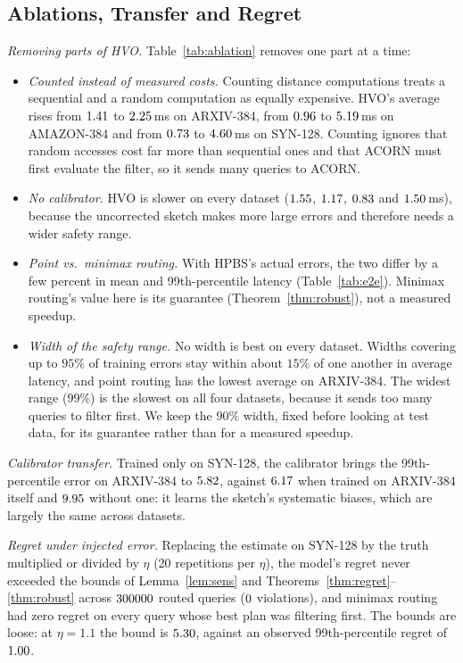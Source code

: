 \documentclass[sigconf, nonacm]{acmart}
\begin{document}
\subsection{Ablations, Transfer and Regret}\label{sec:eval_hw}

\emph{Removing parts of HVO.} Table~\ref{tab:ablation} removes one part at a time:
\begin{itemize}
    \item \emph{Counted instead of measured costs.} Counting distance computations treats a sequential and a random computation as equally expensive. HVO's average rises from $1.41$ to $2.25$\,ms on ARXIV-384, from $0.96$ to $5.19$\,ms on AMAZON-384 and from $0.73$ to $4.60$\,ms on SYN-128. Counting ignores that random accesses cost far more than sequential ones and that ACORN must first evaluate the filter, so it sends many queries to ACORN.
    \item \emph{No calibrator.} HVO is slower on every dataset ($1.55$, $1.17$, $0.83$ and $1.50$\,ms), because the uncorrected sketch makes more large errors and therefore needs a wider safety range.
    \item \emph{Point vs.\ minimax routing.} With HPBS's actual errors, the two differ by a few percent in mean and 99th-percentile latency (Table~\ref{tab:e2e}). Minimax routing's value here is its guarantee (Theorem~\ref{thm:robust}), not a measured speedup.
    \item \emph{Width of the safety range.} No width is best on every dataset. Widths covering up to $95\%$ of training errors stay within about $15\%$ of one another in average latency, and point routing has the lowest average on ARXIV-384. The widest range ($99\%$) is the slowest on all four datasets, because it sends too many queries to filter first. We keep the $90\%$ width, fixed before looking at test data, for its guarantee rather than for a measured speedup.
\end{itemize}

\emph{Calibrator transfer.} Trained only on SYN-128, the calibrator brings the 99th-percentile error on ARXIV-384 to $5.82$, against $6.17$ when trained on ARXIV-384 itself and $9.95$ without one: it learns the sketch's systematic biases, which are largely the same across datasets.

\emph{Regret under injected error.} Replacing the estimate on SYN-128 by the truth multiplied or divided by $\eta$ (20 repetitions per $\eta$), the model's regret never exceeded the bounds of Lemma~\ref{lem:sens} and Theorems~\ref{thm:regret}--\ref{thm:robust} across $300000$ routed queries ($0$ violations), and minimax routing had zero regret on every query whose best plan was filtering first. The bounds are loose: at $\eta=1.1$ the bound is $5.30$, against an observed 99th-percentile regret of $1.00$.
\end{document}
